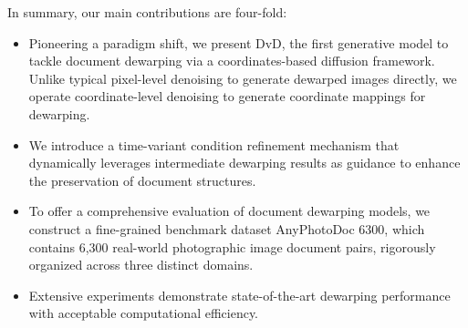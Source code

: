 







In summary, our main contributions are four-fold:
\begin{itemize}[topsep=1pt,leftmargin=*] 
\item Pioneering a paradigm shift, we present DvD, the first generative model to tackle document dewarping via a coordinates-based diffusion framework. Unlike typical pixel-level denoising to generate dewarped images directly, we operate coordinate-level denoising to generate coordinate mappings for dewarping.
\item We introduce a time-variant condition refinement mechanism that dynamically leverages intermediate dewarping results as guidance to enhance the preservation of document structures. 
\item To offer a comprehensive evaluation of document dewarping models, we construct a fine-grained benchmark dataset AnyPhotoDoc 6300, which contains 6,300 real-world photographic image document pairs, rigorously organized across three distinct domains.
\item Extensive experiments demonstrate state-of-the-art dewarping performance with acceptable computational efficiency. 
\end{itemize}


